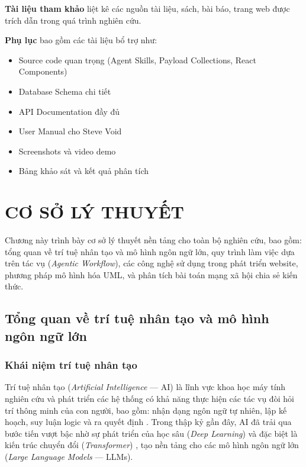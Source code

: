 \documentclass[13pt,a4paper,oneside]{extreport}
\numberwithin{equation}{chapter}
\numberwithin{figure}{chapter}
\numberwithin{table}{chapter}
\begin{document}
\textbf{Tài liệu tham khảo} liệt kê các nguồn tài liệu, sách, bài báo, trang web được trích dẫn trong quá trình nghiên cứu.

\textbf{Phụ lục} bao gồm các tài liệu bổ trợ như:
\begin{itemize}
    \item Source code quan trọng (Agent Skills, Payload Collections, React Components)
    \item Database Schema chi tiết
    \item API Documentation đầy đủ
    \item User Manual cho Steve Void
    \item Screenshots và video demo
    \item Bảng khảo sát và kết quả phân tích
\end{itemize}

\chapter{CƠ SỞ LÝ THUYẾT}

Chương này trình bày cơ sở lý thuyết nền tảng cho toàn bộ nghiên cứu, bao gồm: tổng quan về trí tuệ nhân tạo và mô hình ngôn ngữ lớn, quy trình làm việc dựa trên tác vụ (\textit{Agentic Workflow}), các công nghệ sử dụng trong phát triển website, phương pháp mô hình hóa UML, và phân tích bài toán mạng xã hội chia sẻ kiến thức.

\section{Tổng quan về trí tuệ nhân tạo và mô hình ngôn ngữ lớn}

\subsection{Khái niệm trí tuệ nhân tạo}

Trí tuệ nhân tạo (\textit{Artificial Intelligence} — AI) là lĩnh vực khoa học máy tính nghiên cứu và phát triển các hệ thống có khả năng thực hiện các tác vụ đòi hỏi trí thông minh của con người, bao gồm: nhận dạng ngôn ngữ tự nhiên, lập kế hoạch, suy luận logic và ra quyết định \cite{ref-russell}. Trong thập kỷ gần đây, AI đã trải qua bước tiến vượt bậc nhờ sự phát triển của học sâu (\textit{Deep Learning}) và đặc biệt là kiến trúc chuyển đổi (\textit{Transformer}) \cite{ref-transformer}, tạo nền tảng cho các mô hình ngôn ngữ lớn (\textit{Large Language Models} — LLMs).
\end{document}
